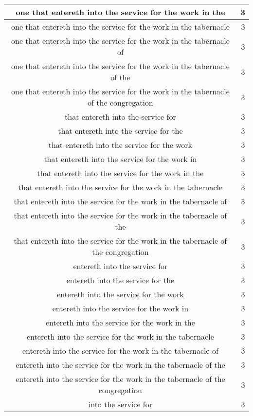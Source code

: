\begin{center}
\begin{longtable}{|c|c|}
one that entereth into the service for the work in the & 3\\ \hline 
one that entereth into the service for the work in the tabernacle & 3\\ \hline 
one that entereth into the service for the work in the tabernacle of & 3\\ \hline 
one that entereth into the service for the work in the tabernacle of the & 3\\ \hline 
one that entereth into the service for the work in the tabernacle of the congregation & 3\\ \hline 
that entereth into the service for & 3\\ \hline 
that entereth into the service for the & 3\\ \hline 
that entereth into the service for the work & 3\\ \hline 
that entereth into the service for the work in & 3\\ \hline 
that entereth into the service for the work in the & 3\\ \hline 
that entereth into the service for the work in the tabernacle & 3\\ \hline 
that entereth into the service for the work in the tabernacle of & 3\\ \hline 
that entereth into the service for the work in the tabernacle of the & 3\\ \hline 
that entereth into the service for the work in the tabernacle of the congregation & 3\\ \hline 
entereth into the service for & 3\\ \hline 
entereth into the service for the & 3\\ \hline 
entereth into the service for the work & 3\\ \hline 
entereth into the service for the work in & 3\\ \hline 
entereth into the service for the work in the & 3\\ \hline 
entereth into the service for the work in the tabernacle & 3\\ \hline 
entereth into the service for the work in the tabernacle of & 3\\ \hline 
entereth into the service for the work in the tabernacle of the & 3\\ \hline 
entereth into the service for the work in the tabernacle of the congregation & 3\\ \hline 
into the service for & 3\\ \hline 

\end{longtable}
\end{center}
